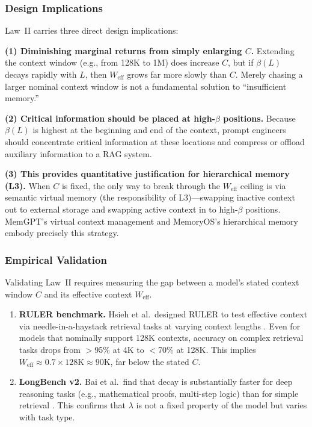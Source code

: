 \documentclass[11pt,a4paper]{article}
\begin{document}
\subsubsection{Design Implications}

Law~II carries three direct design implications:

\textbf{(1) Diminishing marginal returns from simply enlarging $C$.} Extending the context window (e.g., from 128K to 1M) does increase $C$, but if $\beta(L)$ decays rapidly with $L$, then $W_{\mathrm{eff}}$ grows far more slowly than $C$. Merely chasing a larger nominal context window is not a fundamental solution to ``insufficient memory.''

\textbf{(2) Critical information should be placed at high-$\beta$ positions.} Because $\beta(L)$ is highest at the beginning and end of the context, prompt engineers should concentrate critical information at these locations and compress or offload auxiliary information to a RAG system.

\textbf{(3) This provides quantitative justification for hierarchical memory (L3).} When $C$ is fixed, the only way to break through the $W_{\mathrm{eff}}$ ceiling is via semantic virtual memory (the responsibility of L3)---swapping inactive context out to external storage and swapping active context in to high-$\beta$ positions. MemGPT's virtual context management \cite{memgpt2023} and MemoryOS's hierarchical memory \cite{memoryos2025} embody precisely this strategy.

\subsubsection{Empirical Validation}

Validating Law~II requires measuring the gap between a model's stated context window $C$ and its effective context $W_{\mathrm{eff}}$.

\begin{enumerate}[nosep]
\item \textbf{RULER benchmark.} Hsieh et al.\ designed RULER to test effective context via needle-in-a-haystack retrieval tasks at varying context lengths \cite{ruler2024}. Even for models that nominally support 128K contexts, accuracy on complex retrieval tasks drops from $>$95\% at 4K to $<$70\% at 128K. This implies $W_{\mathrm{eff}} \approx 0.7 \times 128\mathrm{K} \approx 90\mathrm{K}$, far below the stated $C$.

\item \textbf{LongBench v2.} Bai et al.\ find that decay is substantially faster for deep reasoning tasks (e.g., mathematical proofs, multi-step logic) than for simple retrieval \cite{longbenchv2_2024}. This confirms that $\lambda$ is not a fixed property of the model but varies with task type.
\end{enumerate}
\end{document}

